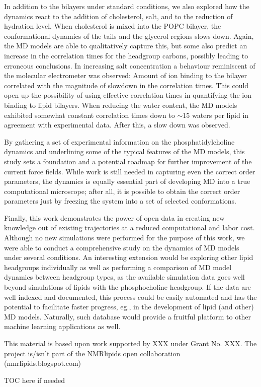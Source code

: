 \documentclass[journal=jpcbfk,manuscript=article,layout=twocolumn]{achemso}
\begin{document}
In addition to the bilayers under standard conditions, we also explored how the dynamics react to the addition of cholesterol, salt, and to the reduction of hydration level. When cholesterol is mixed into the POPC bilayer, the conformational dynamics of the tails and the glycerol regions slows down. Again, the MD models are able to qualitatively capture this, but some also predict an increase in the correlation times for the headgroup carbons, possibly leading to erroneous conclusions. In increasing salt concentration a behaviour reminiscent of the molecular electrometer was observed: Amount of ion binding to the bilayer correlated with the magnitude of slowdown in the correlation times. This could open up the possibility of using effective correlation times in quantifying the ion binding to lipid bilayers. When reducing the water content, the MD models exhibited somewhat constant correlation times down to $\sim$15 waters per lipid in agreement with experimental data. After this, a slow down was observed.

By gathering a set of experimental information on the phosphatidylcholine dynamics and underlining some of the typical features of the MD models, this study sets a foundation and a potential roadmap for further improvement of the current force fields. While work is still needed in capturing even the correct order parameters, the dynamics is equally essential part of developing MD into a true computational microscope; after all, it is possible to obtain the correct order parameters just by freezing the system into a set of selected conformations.  

Finally, this work demonstrates the power of open data in creating new knowledge out of existing trajectories at a reduced computational and labor cost. Although no new simulations were performed for the purpose of this work, we were able to conduct a comprehensive study on the dynamics of MD models under several conditions. An interesting extension would be exploring other lipid headgroups individually as well as performing a comparison of MD model dynamics between headgroup types, as the available simulation data goes well beyond simulations of lipids with the phosphocholine headgroup. If the data are well indexed and documented, this process could be easily automated and has the potential to facilitate faster progress, eg., in the development of lipid (and other) MD models. Naturally, such database would provide a fruitful platform to other machine learning applications as well. 


\acknowledgement
  This material is based upon work supported by XXX under Grant No. XXX. The project is/isn't part of the NMRlipids open collaboration (nmrlipids.blogspot.com)



\begin{tocentry}
 TOC here if needed
\end{tocentry}
\end{document}
